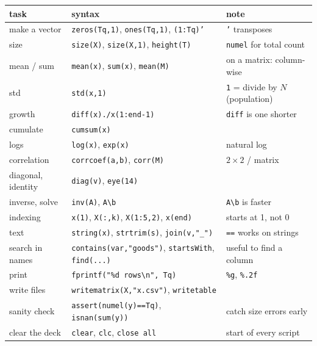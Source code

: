 \documentclass[11pt]{article}
\begin{document}
{\footnotesize
\begin{center}
\begin{tabular}{@{}>{\raggedright\arraybackslash}p{4.1cm}>{\raggedright\arraybackslash}p{6.3cm}>{\raggedright\arraybackslash}p{6.3cm}@{}}
\toprule
task & syntax & note \\
\midrule
make a vector & \texttt{zeros(Tq,1)}, \texttt{ones(Tq,1)}, \texttt{(1:Tq)'} & \texttt{'} transposes \\
size & \texttt{size(X)}, \texttt{size(X,1)}, \texttt{height(T)} & \texttt{numel} for total count \\
mean / sum & \texttt{mean(x)}, \texttt{sum(x)}, \texttt{mean(M)} & on a matrix: column-wise \\
std & \texttt{std(x,1)} & \texttt{1} = divide by $N$ (population) \\
growth & \texttt{diff(x)./x(1:end-1)} & \texttt{diff} is one shorter \\
cumulate & \texttt{cumsum(x)} & \\
logs & \texttt{log(x)}, \texttt{exp(x)} & natural log \\
correlation & \texttt{corrcoef(a,b)}, \texttt{corr(M)} & $2\times2$ / matrix \\
diagonal, identity & \texttt{diag(v)}, \texttt{eye(14)} & \\
inverse, solve & \texttt{inv(A)}, \texttt{A\textbackslash{}b} & \texttt{A\textbackslash{}b} is faster \\
indexing & \texttt{x(1)}, \texttt{X(:,k)}, \texttt{X(1:5,2)}, \texttt{x(end)} & starts at 1, not 0 \\
text & \texttt{string(x)}, \texttt{strtrim(s)}, \texttt{join(v,"\_")} & \texttt{==} works on strings \\
search in names & \texttt{contains(var,"goods")}, \texttt{startsWith}, \texttt{find(...)} & useful to find a column \\
print & \texttt{fprintf("\%d rows\textbackslash{}n", Tq)} & \texttt{\%g}, \texttt{\%.2f} \\
write files & \texttt{writematrix(X,"x.csv")}, \texttt{writetable} & \\
sanity check & \texttt{assert(numel(y)==Tq)}, \texttt{isnan(sum(y))} & catch size errors early \\
clear the deck & \texttt{clear}, \texttt{clc}, \texttt{close all} & start of every script \\
\bottomrule
\end{tabular}
\end{center}}
\end{document}
